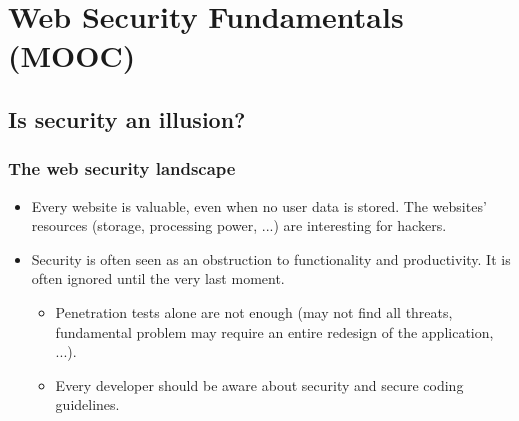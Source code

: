 \documentclass[12pt,titlepage,a4paper]{report}
\begin{document}
	\chapter{Web Security Fundamentals (MOOC)}
		\section{Is security an illusion?}
			\subsection{The web security landscape}
			\begin{itemize}
				\item Every website is valuable, even when no user data is stored. The websites' resources (storage, processing power, ...) are interesting for hackers.
				\item Security is often seen as an obstruction to functionality and productivity. It is often ignored until the very last moment.
				\begin{itemize}
					\item Penetration tests alone are not enough (may not find all threats, fundamental problem may require an entire redesign of the application, ...).
					\item Every developer should be aware about security and secure coding guidelines.
				\end{itemize}
			\end{itemize}
\end{document}
